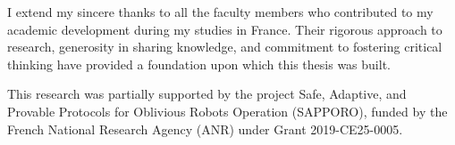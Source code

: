 
I extend my sincere thanks to all the faculty members who contributed to my academic development during my studies in France. Their rigorous approach to research, generosity in sharing knowledge, and commitment to fostering critical thinking have provided a foundation upon which this thesis was built.

This research was partially supported by the project Safe, Adaptive, and Provable Protocols for Oblivious Robots Operation (SAPPORO), funded by the French National Research Agency (ANR) under Grant 2019-CE25-0005.

